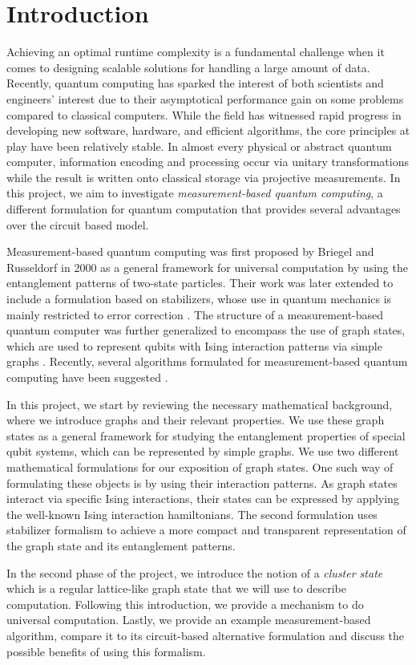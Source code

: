 \section{Introduction}

Achieving an optimal runtime complexity is a fundamental challenge when it comes to designing scalable solutions for handling a large amount of data\cite{sipser13}. Recently, quantum computing has sparked the interest of both scientists and engineers' interest due to their asymptotical performance gain on some problems compared to classical computers. While the field has witnessed rapid progress in developing new software, hardware, and efficient algorithms, the core principles at play have been relatively stable. In almost every physical or abstract quantum computer, information encoding and processing occur via unitary transformations while the result is written onto classical storage via projective measurements\cite{Nielsen2009}. In this project, we aim to investigate \emph{measurement-based quantum computing}, a different formulation for quantum computation that provides several advantages over the circuit based model.

Measurement-based quantum computing was first proposed by Briegel and Russeldorf in 2000 \cite{Briegel_2001} as a general framework for universal computation by using the entanglement patterns of two-state particles. Their work was later extended to include a formulation based on stabilizers, whose use in quantum mechanics is mainly restricted to error correction \cite{Nielsen2009, quant-ph/9705052}. The structure of a measurement-based quantum computer was further generalized to encompass the use of graph states, which are used to represent qubits with Ising interaction patterns via simple graphs \cite{hein2006}. Recently, several algorithms formulated for measurement-based quantum computing have been suggested \cite{keith2014, debeaudrap2008theory, Fitzsimons2017}.

In this project, we start by reviewing the necessary mathematical background, where we introduce graphs and their relevant properties. We use these graph states as a general framework for studying the entanglement properties of special qubit systems, which can be represented by simple graphs. We use two different mathematical formulations for our exposition of graph states. One such way of formulating these objects is by using their interaction patterns. As graph states interact via specific Ising interactions, their states can be expressed by applying the well-known Ising interaction hamiltonians\cite{ichikawa2013}. The second formulation uses stabilizer formalism to achieve a more compact and transparent representation of the graph state and its entanglement patterns.

In the second phase of the project, we introduce the notion of a \emph{cluster state} which is a regular lattice-like graph state that we will use to describe computation. Following this introduction, we provide a mechanism to do universal computation. Lastly, we provide an example measurement-based algorithm, compare it to its circuit-based alternative formulation and discuss the possible benefits of using this formalism.